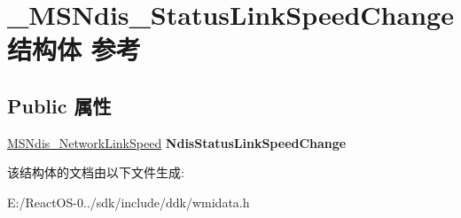\hypertarget{struct___m_s_ndis___status_link_speed_change}{}\section{\+\_\+\+M\+S\+Ndis\+\_\+\+Status\+Link\+Speed\+Change结构体 参考}
\label{struct___m_s_ndis___status_link_speed_change}
\subsection*{Public 属性}
\begin{DoxyCompactItemize}
\item 
\mbox{\label{struct___m_s_ndis___status_link_speed_change_a2e30cafdc53a8790352ac638e8fb1002}} 
\hyperlink{struct___m_s_ndis___network_link_speed}{M\+S\+Ndis\+\_\+\+Network\+Link\+Speed} {\bfseries Ndis\+Status\+Link\+Speed\+Change}
\end{DoxyCompactItemize}


该结构体的文档由以下文件生成\+:\begin{DoxyCompactItemize}
\item 
E\+:/\+React\+O\+S-\/0../sdk/include/ddk/wmidata.\+h\end{DoxyCompactItemize}
